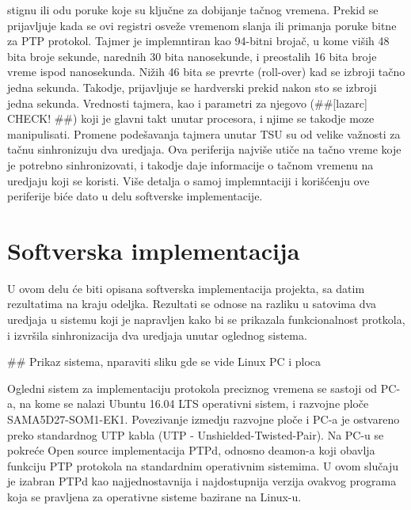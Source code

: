 \documentclass[a4paper,12pt, master]{etf}
\begin{document}
	stignu ili odu poruke koje su klju\v{c}ne za dobijanje ta\v{c}nog vremena. Prekid se 
	prijavljuje kada se ovi	registri osve\v{z}e vremenom slanja ili primanja poruke bitne za PTP 
	protokol. Tajmer je implemntiran kao 94-bitni broja\v{c}, u kome vi\v{s}ih 48 bita broje 
	sekunde, narednih 30 bita nanosekunde, i preostalih 16 bita broje vreme ispod nanosekunda. 
	Ni\v{z}ih 46 bita se prevrte (roll-over) kad se izbroji ta\v{c}no jedna sekunda. Takodje, 
	prijavljuje se hardverski prekid nakon sto se izbroji jedna sekunda. Vrednosti tajmera, kao 
	i parametri za njegovo (\#\#[lazarc] CHECK! \#\#) koji je glavni takt unutar procesora, i njime 
	se takodje moze manipulisati. Promene pode\v{s}avanja tajmera unutar TSU su od velike 
	va\v{z}nosti za ta\v{c}nu sinhronizuju dva uredjaja. Ova periferija najvi\v{s}e uti\v{c}e na 
	ta\v{c}no vreme koje je potrebno sinhronizovati, i takodje daje informacije o ta\v{c}nom 
	vremenu na uredjaju koji se koristi. Vi\v{s}e detalja o samoj implemntaciji i 
	kori\v{s}\'{c}enju ove periferije bi\'{c}e dato u delu softverske implementacije.

	\newpage

	\chapter{Softverska implementacija}

    U ovom delu \'{c}e biti opisana softverska implementacija projekta, sa datim rezultatima na kraju 
    odeljka. Rezultati se odnose na razliku u satovima dva uredjaja u sistemu koji je napravljen kako bi se 
    prikazala funkcionalnost protkola, i izvr\v{s}ila sinhronizacija dva uredjaja unutar oglednog sistema.

    \#\# Prikaz sistema, nparaviti sliku gde se vide Linux PC i ploca

    Ogledni sistem za implementaciju protokola preciznog vremena se sastoji od PC-a, na kome se nalazi Ubuntu 
    16.04 LTS operativni sistem, i razvojne plo\v{c}e SAMA5D27-SOM1-EK1. Povezivanje izmedju razvojne 
    plo\v{c}e i PC-a je ostvareno preko standardnog UTP kabla (UTP - Unshielded-Twisted-Pair). Na PC-u se 
    pokre\'{c}e Open source implementacija PTPd, odnosno deamon-a koji obavlja funkciju PTP protokola na 
    standardnim operativnim sistemima. U ovom slu\v{c}aju je izabran PTPd kao najjednostavnija i 
    najdostupnija verzija ovakvog programa koja se pravljena za operativne sisteme bazirane na Linux-u.
\end{document}
